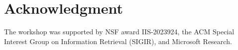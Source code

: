 \documentclass[11pt,dvipdfm]{article}
\begin{document}
\section*{Acknowledgment}
The workshop was supported by NSF award IIS-2023924, the ACM Special Interest Group on Information Retrieval (SIGIR), and Microsoft Research.


%
%








%
%
%
\end{document}

